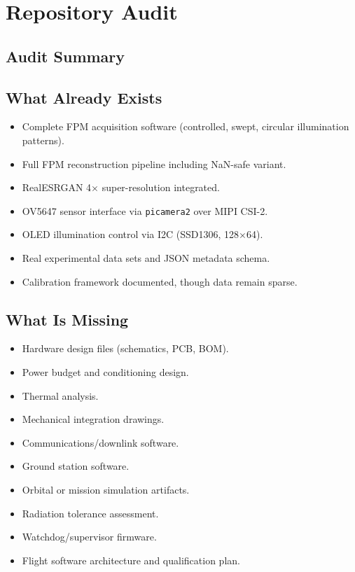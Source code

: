 \section{Repository Audit}

\subsection{Audit Summary}


\subsection{What Already Exists}
\begin{itemize}[leftmargin=1.5em]
    \item Complete FPM acquisition software (controlled, swept, circular illumination patterns).
    \item Full FPM reconstruction pipeline including NaN-safe variant.
    \item RealESRGAN 4$\times$ super-resolution integrated.
    \item OV5647 sensor interface via \texttt{picamera2} over MIPI CSI-2.
    \item OLED illumination control via I2C (SSD1306, 128$\times$64).
    \item Real experimental data sets and JSON metadata schema.
    \item Calibration framework documented, though data remain sparse.
\end{itemize}

\subsection{What Is Missing}
\begin{itemize}[leftmargin=1.5em]
    \item Hardware design files (schematics, PCB, BOM).
    \item Power budget and conditioning design.
    \item Thermal analysis.
    \item Mechanical integration drawings.
    \item Communications/downlink software.
    \item Ground station software.
    \item Orbital or mission simulation artifacts.
    \item Radiation tolerance assessment.
    \item Watchdog/supervisor firmware.
    \item Flight software architecture and qualification plan.
\end{itemize}
